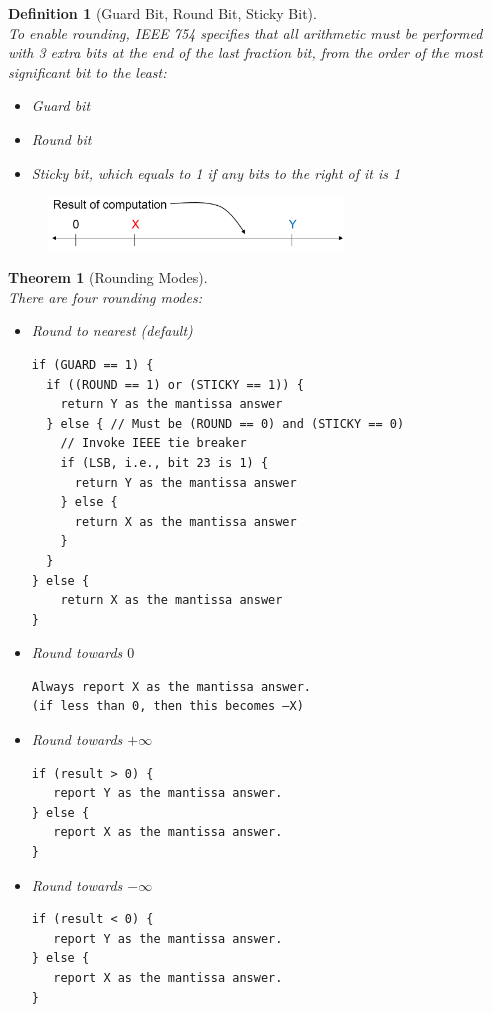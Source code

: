 \documentclass[12pt]{article}
\newtheorem{definition}{Definition}[section]
\newtheorem{theorem}{Theorem}[section]
\theoremstyle{definition}
\begin{document}
\begin{definition}[Guard Bit, Round Bit, Sticky Bit]\hfill\\\normalfont
To enable rounding, IEEE 754 specifies that all arithmetic must be performed with 3 extra bits at the end of the last fraction bit, from the order of the most significant bit to the least:
\begin{itemize}
  \item Guard bit
  \item Round bit
  \item Sticky bit, which equals to 1 if any bits to the right of it is 1
\end{itemize}
\end{definition}
\begin{figure}[h]
\centering
  \includegraphics[width = 0.7\textwidth]{2_2.png}
\end{figure}
\begin{theorem}[Rounding Modes]\hfill\\\normalfont
There are four rounding modes:
\begin{itemize}
  \item Round to nearest (default)
  \begin{verbatim}
if (GUARD == 1) {
  if ((ROUND == 1) or (STICKY == 1)) {
    return Y as the mantissa answer
  } else { // Must be (ROUND == 0) and (STICKY == 0)
    // Invoke IEEE tie breaker
    if (LSB, i.e., bit 23 is 1) {
      return Y as the mantissa answer
    } else {
      return X as the mantissa answer
    }
  }
} else {
    return X as the mantissa answer
}
\end{verbatim}
  \item Round towards $0$
  \begin{verbatim}
Always report X as the mantissa answer.
(if less than 0, then this becomes –X)
\end{verbatim}
  \item Round towards $+\infty$
  \begin{verbatim}
if (result > 0) {
   report Y as the mantissa answer.
} else {
   report X as the mantissa answer.
}
\end{verbatim}
  \item Round towards $-\infty$
\begin{verbatim}
if (result < 0) {
   report Y as the mantissa answer.
} else {
   report X as the mantissa answer.
}
\end{verbatim}
\end{itemize}
\end{theorem}
\end{document}
